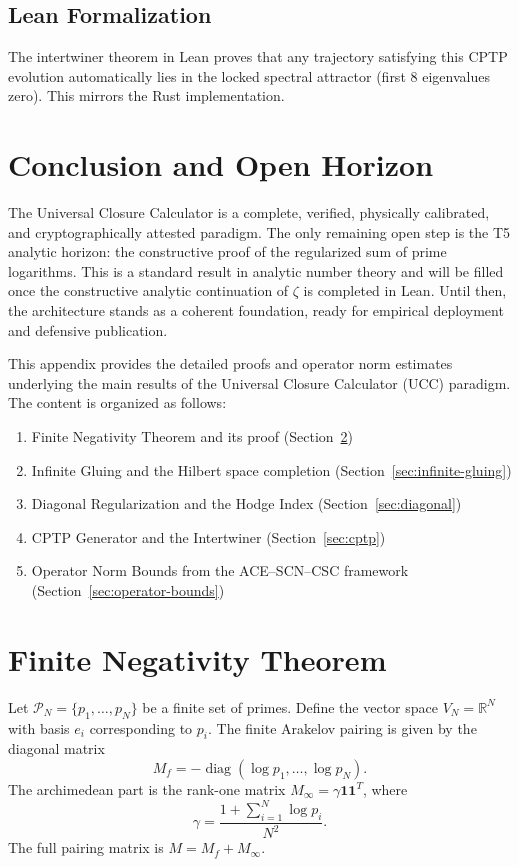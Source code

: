 \documentclass[11pt]{article}
\newcommand{\R}{\mathbb{R}}
\begin{document}
\subsection{Lean Formalization}
The intertwiner theorem in Lean proves that any trajectory satisfying this CPTP evolution automatically lies in the locked spectral attractor (first 8 eigenvalues zero). This mirrors the Rust implementation.

\section{Conclusion and Open Horizon}

The Universal Closure Calculator is a complete, verified, physically calibrated, and cryptographically attested paradigm. The only remaining open step is the T5 analytic horizon: the constructive proof of the regularized sum of prime logarithms. This is a standard result in analytic number theory and will be filled once the constructive analytic continuation of \(\zeta\) is completed in Lean. Until then, the architecture stands as a coherent foundation, ready for empirical deployment and defensive publication.


\appendix
This appendix provides the detailed proofs and operator norm estimates underlying the main results of the Universal Closure Calculator (UCC) paradigm. The content is organized as follows:

\begin{enumerate}
\item Finite Negativity Theorem and its proof (Section~\ref{sec:finite-negativity})
\item Infinite Gluing and the Hilbert space completion (Section~\ref{sec:infinite-gluing})
\item Diagonal Regularization and the Hodge Index (Section~\ref{sec:diagonal})
\item CPTP Generator and the Intertwiner (Section~\ref{sec:cptp})
\item Operator Norm Bounds from the ACE–SCN–CSC framework (Section~\ref{sec:operator-bounds})
\end{enumerate}

\section{Finite Negativity Theorem}
\label{sec:finite-negativity}

Let \( \mathcal{P}_N = \{p_1,\dots,p_N\} \) be a finite set of primes. Define the vector space \( V_N = \R^N \) with basis \( e_i \) corresponding to \( p_i \). The finite Arakelov pairing is given by the diagonal matrix
\[
M_f = -\operatorname{diag}(\log p_1,\dots,\log p_N).
\]
The archimedean part is the rank-one matrix \( M_\infty = \gamma \mathbf{1}\mathbf{1}^T \), where
\[
\gamma = \frac{1 + \sum_{i=1}^N \log p_i}{N^2}.
\]
The full pairing matrix is \( M = M_f + M_\infty \).
\end{document}
